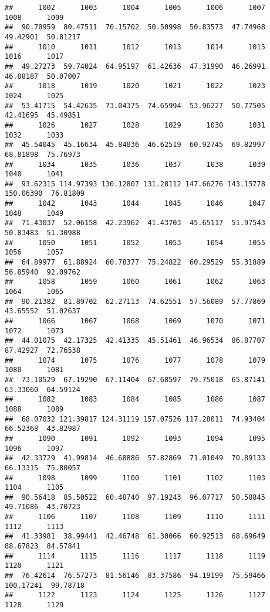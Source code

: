 \documentclass[
]{article}
\begin{document}
\begin{verbatim}
##      1002      1003      1004      1005      1006      1007      1008      1009 
##  90.70959  80.47511  70.15702  50.50998  50.83573  47.74968  49.42901  50.81217 
##      1010      1011      1012      1013      1014      1015      1016      1017 
##  49.27273  59.74024  64.95197  61.42636  47.31990  46.26991  46.08187  50.07007 
##      1018      1019      1020      1021      1022      1023      1024      1025 
##  53.41715  54.42635  73.04375  74.65994  53.96227  50.77505  42.41695  45.49851 
##      1026      1027      1028      1029      1030      1031      1032      1033 
##  45.54045  45.16634  45.84036  46.62519  60.92745  69.82997  68.81898  75.76973 
##      1034      1035      1036      1037      1038      1039      1040      1041 
##  93.62315 114.97393 130.12807 131.28112 147.66276 143.15778 150.06390  76.81809 
##      1042      1043      1044      1045      1046      1047      1048      1049 
##  71.43037  52.06158  42.23962  41.43703  45.65117  51.97543  50.83483  51.30988 
##      1050      1051      1052      1053      1054      1055      1056      1057 
##  64.89977  61.88924  60.78377  75.24822  60.29529  55.31889  56.85940  92.09762 
##      1058      1059      1060      1061      1062      1063      1064      1065 
##  90.21382  81.89702  62.27113  74.62551  57.56089  57.77869  43.65552  51.02637 
##      1066      1067      1068      1069      1070      1071      1072      1073 
##  44.01075  42.17325  42.41335  45.51461  46.96534  86.87707  87.42927  72.76538 
##      1074      1075      1076      1077      1078      1079      1080      1081 
##  73.10529  67.19290  67.11404  67.68597  79.75018  65.87141  63.33060  64.59124 
##      1082      1083      1084      1085      1086      1087      1088      1089 
##  68.07032 121.39817 124.31119 157.07526 117.28011  74.93404  66.52368  43.82987 
##      1090      1091      1092      1093      1094      1095      1096      1097 
##  42.33729  41.99814  46.68886  57.82869  71.01049  70.89133  66.13315  75.80057 
##      1098      1099      1100      1101      1102      1103      1104      1105 
##  90.56418  85.50522  60.48740  97.19243  96.07717  50.58845  49.71086  43.70723 
##      1106      1107      1108      1109      1110      1111      1112      1113 
##  41.33981  38.99441  42.46748  61.30066  60.92513  68.69649  88.67823  84.57841 
##      1114      1115      1116      1117      1118      1119      1120      1121 
##  76.42614  76.57273  81.56146  83.37586  94.19199  75.59466 100.17241  99.78718 
##      1122      1123      1124      1125      1126      1127      1128      1129 

\end{verbatim}
\end{document}
